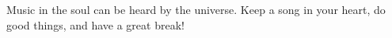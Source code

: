 Music in the soul can be heard by the universe. Keep a song in your heart, do good things, and have a great break!
